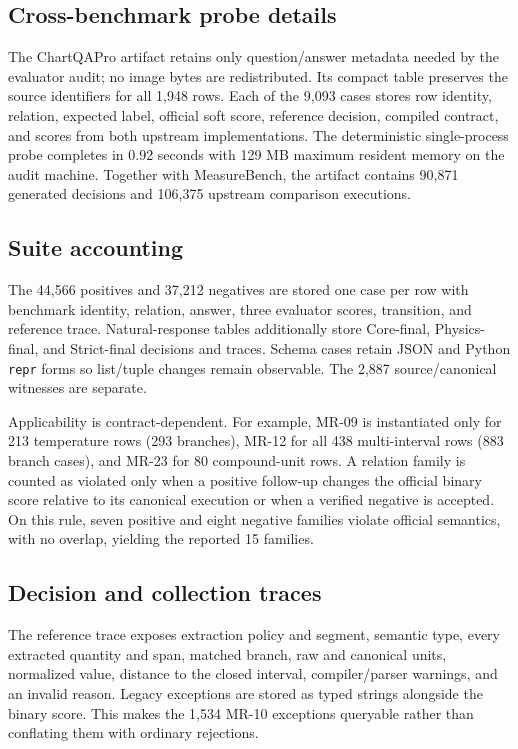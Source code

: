 \subsection{Cross-benchmark probe details}
The ChartQAPro artifact retains only question/answer metadata needed by the evaluator audit; no image bytes are redistributed. Its compact table preserves the source identifiers for all 1,948 rows. Each of the 9,093 cases stores row identity, relation, expected label, official soft score, reference decision, compiled contract, and scores from both upstream implementations. The deterministic single-process probe completes in 0.92 seconds with 129 MB maximum resident memory on the audit machine. Together with MeasureBench, the artifact contains 90,871 generated decisions and 106,375 upstream comparison executions.

\subsection{Suite accounting}
The 44,566 positives and 37,212 negatives are stored one case per row with benchmark identity, relation, answer, three evaluator scores, transition, and reference trace. Natural-response tables additionally store Core-final, Physics-final, and Strict-final decisions and traces. Schema cases retain JSON and Python \texttt{repr} forms so list/tuple changes remain observable. The 2,887 source/canonical witnesses are separate.

Applicability is contract-dependent. For example, MR-09 is instantiated only for 213 temperature rows (293 branches), MR-12 for all 438 multi-interval rows (883 branch cases), and MR-23 for 80 compound-unit rows. A relation family is counted as violated only when a positive follow-up changes the official binary score relative to its canonical execution or when a verified negative is accepted. On this rule, seven positive and eight negative families violate official semantics, with no overlap, yielding the reported 15 families.

\subsection{Decision and collection traces}
The reference trace exposes extraction policy and segment, semantic type, every extracted quantity and span, matched branch, raw and canonical units, normalized value, distance to the closed interval, compiler/parser warnings, and an invalid reason. Legacy exceptions are stored as typed strings alongside the binary score. This makes the 1,534 MR-10 exceptions queryable rather than conflating them with ordinary rejections.

